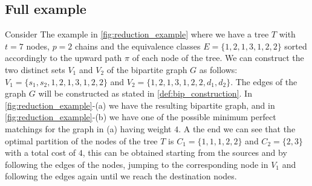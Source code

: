 \subsection{Full example}
Consider The example in \cref{fig:reduction_example} where we have a tree $T$ with $t=7$ nodes, $p = 2$ chains and the equivalence classes $E = \{1,2,1,3,1,2,2\}$ sorted accordingly to the upward path $\pi$ of each node of the tree. We can construct the two distinct sets $V_1$ and $V_2$ of the bipartite graph $G$ as follows: $V_1 = \{s_1, s_2, 1,2,1,3,1,2,2\}$ and $V_2 = \{1,2,1,3,1,2,2, d_1, d_2\}$. The edges of the graph $G$ will be constructed as stated in \cref{def:bip_construction}. In \cref{fig:reduction_example}-(a) we have the resulting bipartite graph, and in \cref{fig:reduction_example}-(b) we have one of the possible minimum perfect matchings for the graph in (a) having weight $4$. A the end we can see that the optimal partition of the nodes of the tree $T$ is $C_1 = \{1,1,1,2,2\}$ and $C_2 = \{2,3\}$ with a total cost of $4$, this can be obtained starting from the sources and by following the edges of the nodes, jumping to the corresponding node in $V_1$ and following the edges again until we reach the destination nodes.

